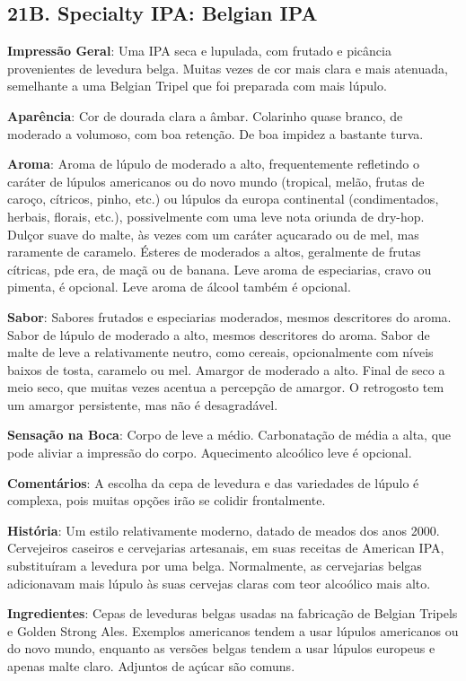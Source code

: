 \subsection*{21B. Specialty IPA: Belgian IPA}
\textbf{Impressão Geral}: Uma IPA seca e lupulada, com frutado e picância provenientes de levedura belga. Muitas vezes de cor mais clara e mais atenuada, semelhante a uma Belgian Tripel que foi preparada com mais lúpulo.

\textbf{Aparência}: Cor de dourada clara a âmbar. Colarinho quase branco, de moderado a volumoso, com boa retenção. De boa impidez a bastante turva.

\textbf{Aroma}: Aroma de lúpulo de moderado a alto, frequentemente refletindo o caráter de lúpulos americanos ou do novo mundo (tropical, melão, frutas de caroço, cítricos, pinho, etc.) ou lúpulos da europa continental (condimentados, herbais, florais, etc.), possivelmente com uma leve nota oriunda de dry-hop. Dulçor suave do malte, às vezes com um caráter açucarado ou de mel, mas raramente de caramelo. Ésteres de moderados a altos, geralmente de frutas cítricas, pde era, de maçã ou de banana. Leve aroma de especiarias, cravo ou pimenta, é opcional. Leve aroma de álcool também é opcional.

\textbf{Sabor}: Sabores frutados e especiarias moderados, mesmos descritores do aroma. Sabor de lúpulo de moderado a alto, mesmos descritores do aroma. Sabor de malte de leve a relativamente neutro, como cereais, opcionalmente com níveis baixos de tosta, caramelo ou mel. Amargor de moderado a alto. Final de seco a meio seco, que muitas vezes acentua a percepção de amargor. O retrogosto tem um amargor persistente, mas não é desagradável.

\textbf{Sensação na Boca}: Corpo de leve a médio. Carbonatação de média a alta, que pode aliviar a impressão do corpo. Aquecimento alcoólico leve é opcional.

\textbf{Comentários}: A escolha da cepa de levedura e das variedades de lúpulo é complexa, pois muitas opções irão se colidir frontalmente.

\textbf{História}: Um estilo relativamente moderno, datado de meados dos anos 2000. Cervejeiros caseiros e cervejarias artesanais, em suas receitas de American IPA, substituíram a levedura por uma belga. Normalmente, as cervejarias belgas adicionavam mais lúpulo às suas cervejas claras com teor alcoólico mais alto.

\textbf{Ingredientes}: Cepas de leveduras belgas usadas na fabricação de Belgian Tripels e Golden Strong Ales. Exemplos americanos tendem a usar lúpulos americanos ou do novo mundo, enquanto as versões belgas tendem a usar lúpulos europeus e apenas malte claro. Adjuntos de açúcar são comuns.

